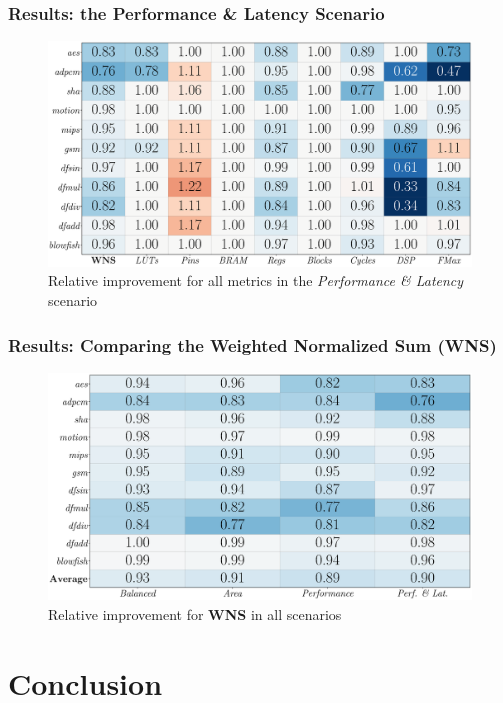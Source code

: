\documentclass[10pt, compress, xcolor={table,xcdraw,usenames}, aspectratio=169]{beamer}
\begin{document}
\begin{frame}
    \frametitle{Results: the Performance \& Latency Scenario}
    \begin{figure}[htpb]
        \centering
        \includegraphics[width=0.8\columnwidth]{heatmap_default_stratixV_perflat}
        \caption{Relative improvement for all metrics in the
        \textit{Performance \& Latency} scenario}
    \end{figure}
\end{frame}

\begin{frame}
    \frametitle{Results: Comparing the Weighted Normalized Sum (WNS)}
    \begin{figure}[htpb]
        \centering
        \includegraphics[width=0.8\columnwidth]{heatmap_wns_comparison}
        \caption{Relative improvement for \textbf{WNS} in all scenarios}
    \end{figure}
\end{frame}

\section{Conclusion}
\end{document}
